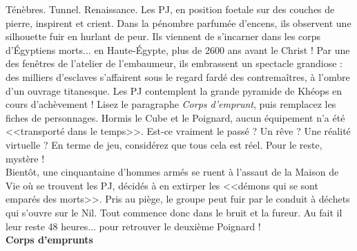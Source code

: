 \documentclass[11pt,twoside,a4paper]{book}
\begin{document}
T{\'e}n{\`e}bres. Tunnel. Renaissance. Les PJ, en position foetale sur des couches de pierre, inspirent et crient. Dans la p{\'e}nombre parfum{\'e}e d'encens, ils observent une silhouette fuir en hurlant de peur. Ils viennent de s'incarner dans les corps d'{\'E}gyptiens morts... en Haute-{\'E}gypte, plus de 2600 ans avant le Christ ! Par une des fen{\^e}tres de l'atelier de l'embaumeur, ils embrassent un spectacle grandiose : des milliers d'esclaves s'affairent sous le regard fard{\'e} des contrema{\^i}tres, {\`a} l'ombre d'un ouvrage titanesque. Les PJ contemplent la grande pyramide de Kh{\'e}ops en cours d'ach{\`e}vement ! Lisez le paragraphe \emph{Corps d'emprunt}, puis remplacez les fiches de personnages. Hormis le Cube et le Poignard, aucun {\'e}quipement n'a {\'e}t{\'e} <<transport{\'e} dans le temps>>. Est-ce vraiment le pass{\'e} ? Un r{\^e}ve ? Une r{\'e}alit{\'e} virtuelle ? En terme de jeu, consid{\'e}rez que tous cela est r{\'e}el. Pour le reste, myst{\`e}re !~\\ %

Bient{\^o}t, une cinquantaine d'hommes arm{\'e}s se ruent {\`a} l'assaut de la Maison de Vie o{\`u} se trouvent les PJ, d{\'e}cid{\'e}s {\`a} en extirper les <<d{\'e}mons qui se sont empar{\'e}s des morts>>. Pris au pi{\`e}ge, le groupe peut fuir par le conduit {\`a} d{\'e}chets qui s'ouvre sur le Nil. Tout commence donc dans le bruit et la fureur. Au fait il leur reste 48 heures... pour retrouver le deuxi{\`e}me Poignard !~\\

\textbf{\large Corps d'emprunts}~\\
\end{document}
